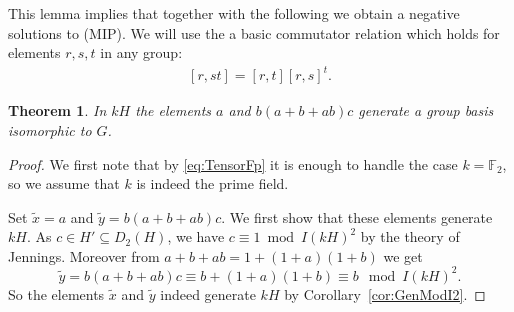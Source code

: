 \documentclass[11pt, a4paper]{amsart}
\newtheorem{theorem}{Theorem}[section]
\theoremstyle{definition}
\begin{document}
This lemma implies that together with the following we obtain a negative solutions to (MIP). We will use the a basic commutator relation which holds for elements $r,s,t$ in any group:
\begin{align}\label{eq:CommRel}
[r,st] = [r,t][r,s]^t.
\end{align}

\begin{theorem}
In $kH$ the elements $a$ and $b(a+b+ab)c$ generate a group basis isomorphic to $G$.
\end{theorem}
\begin{proof}
We first note that by \eqref{eq:TensorFp} it is enough to handle the case $k = \mathbb{F}_2$, so we assume that $k$ is indeed the prime field.

Set $\tilde{x} = a$ and $\tilde{y} = b(a+b+ab)c$. We first show that these elements generate $kH$. As $c \in H' \subseteq D_2(H)$, we have $c \equiv 1 \bmod I(kH)^2$ by the theory of Jennings. Moreover from $a + b + ab = 1 + (1+a)(1+b)$ we get
\[\tilde{y} = b(a+b+ab)c \equiv b + (1+a)(1+b) \equiv b \mod I(kH)^2.\]
So the elements $\tilde{x}$ and $\tilde{y}$ indeed generate $kH$ by Corollary~\ref{cor:GenModI2}.


\end{proof}
\end{document}
